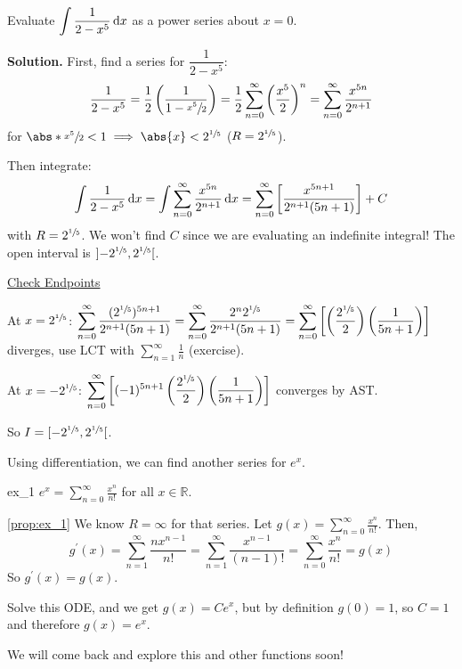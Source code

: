 \begin{Example}{}{}
    Evaluate $ \displaystyle \int \frac{1}{2-x^5} \odif{x}  $
    as a power series about $ x=0 $.

    \textbf{Solution.} First, find a series for $ \dfrac{1}{2-x^5} $:
    \[ \frac{1}{2-x^5}
        =\frac{1}{2} \left( \frac{1}{1-\sfrac{x^5}{2}} \right)
        =\frac{1}{2} \sum\limits_{n=0}^{\infty} \left( \frac{x^5}{2}  \right)^n
        =\sum\limits_{n=0}^{\infty} \frac{x^{5n}}{2^{n+1}}  \]
    for $ \abs*{\sfrac{x^5}{2} }<1\implies \abs{x}<2^{\sfrac{1}{5}} $ ($ R=2^{\sfrac{1}{5}} $).

    Then integrate:
    \[ \int \frac{1}{2-x^5} \odif{x} =
        \int \sum\limits_{n=0}^{\infty} \frac{x^{5n}}{2^{n+1}} \odif{x}
        =\sum\limits_{n=0}^{\infty} \left[ \frac{x^{5n+1}}{2^{n+1}(5n+1)}  \right]+C \]
    with $ R=2^{\sfrac{1}{5}} $. We won't find $ C $ since we are evaluating an
    indefinite integral! The open interval is $ \interval[open]{-2^{\sfrac{1}{5}}}{2^{\sfrac{1}{5}  }} $.

    \underline{Check Endpoints}

    At $ x=2^{\sfrac{1}{5}} $: $ \displaystyle \sum\limits_{n=0}^{\infty}
        \frac{(2^{\sfrac{1}{5}})^{5n+1}}{2^{n+1}(5n+1)}=
        \sum\limits_{n=0}^{\infty} \frac{2^n 2^{\sfrac{1}{5}}}{2^{n+1}(5n+1)}
        =\sum\limits_{n=0}^{\infty} \left[ \left( \frac{2^{\sfrac{1}{5} }}{2} \right)
            \left( \frac{1}{5n+1} \right) \right]  $ diverges,
    use LCT with $ \sum\limits_{n=1}^{\infty} \frac{1}{n} $ (exercise).

    At $ x=-2^{\sfrac{1}{5} } $:
    $ \displaystyle \sum\limits_{n=0}^{\infty}
        \left[(-1)^{5n+1}\left( \frac{2^{\sfrac{1}{5} }}{2}  \right)
            \left( \frac{1}{5n+1}  \right)\right] $ converges by AST\@.

    So $ I=\interval[open right]{-2^{\sfrac{1}{5} }}{2^{\sfrac{1}{5}}} $.
\end{Example}

Using differentiation, we can find another series for $ e^x $.

\begin{Proposition}{}{ex_1}
    $ \displaystyle e^x=\sum\limits_{n=0}^{\infty} \frac{x^n}{n!} $
    for all $ x\in\mathbb{R} $.
\end{Proposition}

\begin{Proof}{\ref{prop:ex_1}}{}
    We know $ R=\infty $ for that series. Let $ g(x)=\displaystyle \sum\limits_{n=0}^{\infty}
        \frac{x^n}{n!} $. Then,
    \[ g^\prime(x)=\sum\limits_{n=1}^{\infty} \frac{n x^{n-1}}{n!}
        =\sum\limits_{n=1}^{\infty} \frac{x^{n-1}}{(n-1)!}
        =\sum\limits_{n=0}^{\infty} \frac{x^n}{n!}=g(x) \]
    So $ g^\prime(x)=g(x) $.

    Solve this ODE, and we get $ g(x)=Ce^x $, but by definition $ g(0)=1 $,
    so $ C=1 $ and therefore $ g(x)=e^x $.
\end{Proof}

We will come back and explore this and other functions soon!
